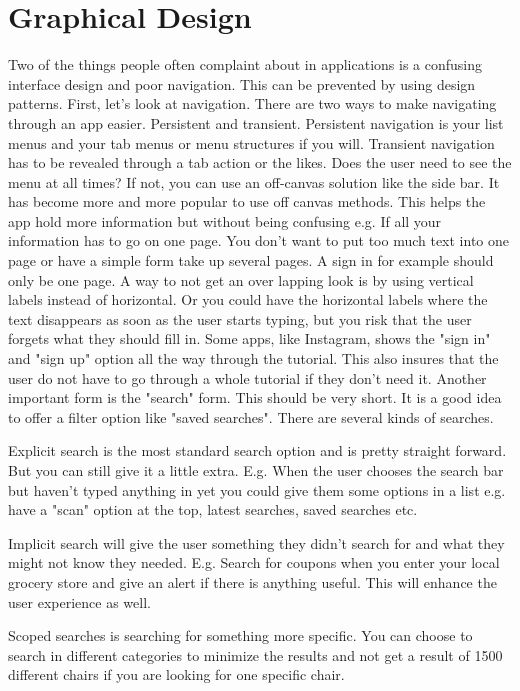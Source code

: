 \section{Graphical Design}
Two of the things people often complaint about in applications is a confusing interface design and poor navigation. \cite{Pattern} This can be prevented by using design patterns. 
First, let's look at navigation. There are two ways to make navigating through an app easier. Persistent and transient. Persistent navigation is your list menus and your tab menus or menu structures if you will. Transient navigation has to be revealed through a tab action or the likes.\cite{Pattern}
Does the user need to see the menu at all times? If not, you can use an off-canvas solution like the side bar. 
It has become more and more popular to use off canvas methods. \cite{Pattern} This helps the app hold more information but without being confusing e.g. If all your information has to go on one page. 
You don't want to put too much text into one page or have a simple form take up several pages. A sign in for example should only be one page. A way to not get an over lapping look is by using vertical labels instead of horizontal. \cite{Pattern} Or you could have the horizontal labels where the text disappears as soon as the user starts typing, but you risk that the user forgets what they should fill in.\cite{Pattern} 
Some apps, like Instagram, shows the "sign in" and "sign up" option all the way through the tutorial. This also insures that the user do not have to go through a whole tutorial if they don’t need it. 
Another important form is the "search" form. This should be very short. It is a good idea to offer a filter option like "saved searches". There are several kinds of searches. 

Explicit search is the most standard search option and is pretty straight forward. But you can still give it a little extra. E.g. When the user chooses the search bar but haven't typed anything in yet you could give them some options in a list e.g. have a "scan" option at the top, latest searches, saved searches etc. \cite{Pattern}

Implicit search will give the user something they didn't search for and what they might not know they needed. E.g. Search for coupons when you enter your local grocery store and give an alert if there is anything useful. This will enhance the user experience as well. \cite{Pattern}

Scoped searches is searching for something more specific. You can choose to search in different categories to minimize the results and not get a result of 1500 different chairs if you are looking for one specific chair. \cite{Pattern}

